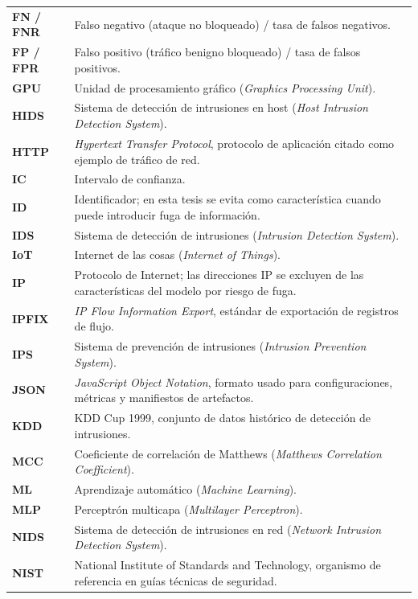 \begin{longtable}{@{}p{2.6cm}p{10.8cm}@{}}
\textbf{FN / FNR} & Falso negativo (ataque no bloqueado) / tasa de falsos negativos. \\[2pt]
\textbf{FP / FPR} & Falso positivo (tráfico benigno bloqueado) / tasa de falsos positivos. \\[2pt]
\textbf{GPU} & Unidad de procesamiento gráfico (\emph{Graphics Processing Unit}). \\[2pt]
\textbf{HIDS} & Sistema de detección de intrusiones en host (\emph{Host Intrusion Detection System}). \\[2pt]
\textbf{HTTP} & \emph{Hypertext Transfer Protocol}, protocolo de aplicación citado como ejemplo de tráfico de red. \\[2pt]
\textbf{IC} & Intervalo de confianza. \\[2pt]
\textbf{ID} & Identificador; en esta tesis se evita como característica cuando puede introducir fuga de información. \\[2pt]
\textbf{IDS} & Sistema de detección de intrusiones (\emph{Intrusion Detection System}). \\[2pt]
\textbf{IoT} & Internet de las cosas (\emph{Internet of Things}). \\[2pt]
\textbf{IP} & Protocolo de Internet; las direcciones IP se excluyen de las características del modelo por riesgo de fuga. \\[2pt]
\textbf{IPFIX} & \emph{IP Flow Information Export}, estándar de exportación de registros de flujo. \\[2pt]
\textbf{IPS} & Sistema de prevención de intrusiones (\emph{Intrusion Prevention System}). \\[2pt]
\textbf{JSON} & \emph{JavaScript Object Notation}, formato usado para configuraciones, métricas y manifiestos de artefactos. \\[2pt]
\textbf{KDD} & KDD Cup 1999, conjunto de datos histórico de detección de intrusiones. \\[2pt]
\textbf{MCC} & Coeficiente de correlación de Matthews (\emph{Matthews Correlation Coefficient}). \\[2pt]
\textbf{ML} & Aprendizaje automático (\emph{Machine Learning}). \\[2pt]
\textbf{MLP} & Perceptrón multicapa (\emph{Multilayer Perceptron}). \\[2pt]
\textbf{NIDS} & Sistema de detección de intrusiones en red (\emph{Network Intrusion Detection System}). \\[2pt]
\textbf{NIST} & National Institute of Standards and Technology, organismo de referencia en guías técnicas de seguridad. \\[2pt]

\end{longtable}
